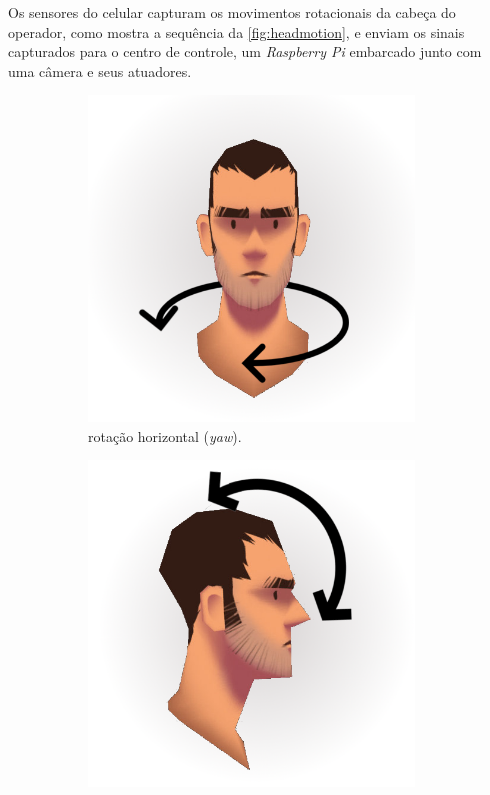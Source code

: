 Os sensores do celular capturam os movimentos rotacionais da cabeça do operador, como mostra a sequência da \autoref{fig:headmotion}, e enviam os sinais capturados para o centro de controle, um \textit{Raspberry Pi} embarcado junto com uma câmera e seus atuadores.\par

\begin{figure}[H]
	\centering
	\begin{subfigure}{.5\textwidth}
		\includegraphics[width=0.95\textwidth]{figuras/yaw.png}
		\caption{rotação horizontal (\textit{yaw}).}
		\label{fig:headmotion_yaw}
	\end{subfigure}%
	\begin{subfigure}{.5\textwidth}
		\includegraphics[width=0.95\textwidth]{figuras/pitch.png}

\end{subfigure}
\end{figure}
